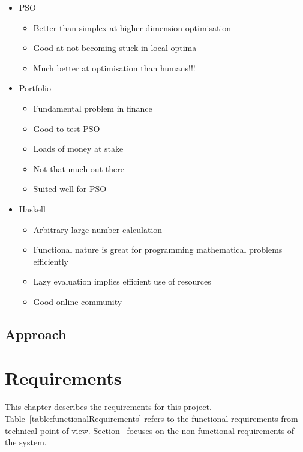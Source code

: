 \documentclass{pdfmx4020}
\begin{document}
  \begin{itemize}
    \item PSO
    \begin{itemize}
      \item Better than simplex at higher dimension optimisation
      \item Good at not becoming stuck in local optima
      \item Much better at optimisation than humans!!!
    \end{itemize}
    \item Portfolio
    \begin{itemize}
      \item Fundamental problem in finance
      \item Good to test PSO
      \item Loads of money at stake
      \item Not that much out there
      \item Suited well for PSO
    \end{itemize}
    \item Haskell
    \begin{itemize}
      \item Arbitrary large number calculation
      \item Functional nature is great for programming mathematical problems efficiently
      \item Lazy evaluation implies efficient use of resources
      \item Good online community
    \end{itemize}
  \end{itemize}


  \section{Approach} %
  \label{sec:approach}

  

\chapter{Requirements}
This chapter describes the requirements for this project. Table~\ref{table:functionalRequirements} refers to the functional requirements from technical point of view. Section~ focuses on the non-functional requirements of the system.
\end{document}
